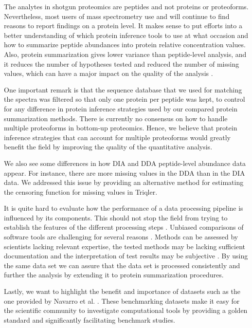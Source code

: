 \documentclass[10pt,letterpaper]{article}
\begin{document}
The analytes in shotgun proteomics are peptides and not proteins or proteoforms. Nevertheless, most users of mass spectrometry use and will continue to find reasons to report findings on a protein level. It makes sense to put efforts into a better understanding of which protein inference tools to use at what occasion and how to summarize peptide abundances into protein relative concentration values. Also, protein summarization gives lower variance than peptide-level analysis, and it reduces the number of hypotheses tested and reduced the number of missing values, which can have a major impact on the quality of the analysis \cite{plubell2021can}.   

One important remark is that the sequence database that we used for matching the spectra was filtered so that only one protein per peptide was kept, to control for any difference in protein inference strategies used by our compared protein summarization methods. There is currently no consensus on how to handle multiple proteoforms in bottom-up proteomics. Hence, we believe that protein inference strategies that can account for multiple proteoforms would greatly benefit the field by improving the quality of the quantitative analysis. 

We also see some differences in how DIA and DDA peptide-level abundance data appear. For instance, there are more missing values in the DDA than in the DIA data. We addressed this issue by providing an alternative method for estimating the censoring function for missing values in Triqler.

It is quite hard to evaluate how the performance of a data processing pipeline is influenced by its components. This should not stop the field from trying to establish the features of the different processing steps \cite{dufresne2014abrf,gatto2016testing,navarro2016multicenter}. Unbiased comparisons of software tools are challenging for several reasons \cite{dufresne2014abrf}. Methods can be assessed by scientists lacking relevant expertise, the tested methods may be lacking sufficient documentation and the interpretation of test results may be subjective \cite{yates2012toward,leprevost2014best,pak2013clustering,faircomparison2015}. By using the same data set we can assure that the data set is processed consistently and further the analysis by extending it to protein summarization procedures.

Lastly, we want to highlight the benefit and importance of datasets such as the one provided by Navarro et al. \cite{navarro2016multicenter}. These benchmarking datasets make it easy for the scientific community to investigate computational tools by providing a golden standard and significantly facilitating benchmark studies. 
\end{document}
